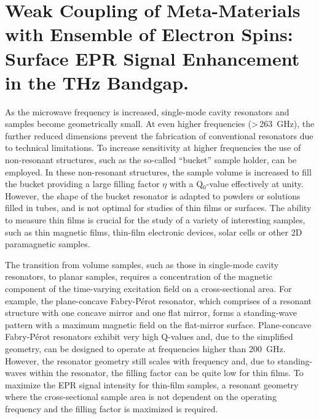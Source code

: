 \chapter[Weak Coupling of Meta-Materials for FD-FT THz EPR]{Weak Coupling of Meta-Materials with Ensemble of Electron Spins: Surface EPR Signal Enhancement in the THz Bandgap.}

As the microwave frequency is increased, single-mode cavity resonators and samples become geometrically small. At even higher frequencies (>\,263~GHz), the further reduced dimensions prevent the fabrication of conventional resonators due to technical limitations. To increase sensitivity at higher frequencies the use of non-resonant structures, such as the so-called ``bucket'' sample holder, can be employed. In these non-resonant structures, the sample volume is increased to fill the bucket providing a large filling factor $\eta$ with a Q$_0$-value effectively at unity. \cite{grinbergVHF} However, the shape of the bucket resonator is adapted to powders or solutions filled in tubes, and is not optimal for studies of thin films or surfaces. The ability to measure thin films is crucial for the study of a variety of interesting samples, such as thin magnetic films, thin-film electronic devices, solar cells or other 2D paramagnetic samples.

The transition from volume samples, such as those in single-mode cavity resonators, to planar samples, requires a concentration of the magnetic component of the time-varying excitation field on a cross-sectional area. For example, the plane-concave Fabry-P\'{e}rot resonator, which comprises of a resonant structure with one concave mirror and one flat mirror, forms a standing-wave pattern with a maximum magnetic field on the flat-mirror surface. \cite{grinbergVHF} Plane-concave Fabry-P\'{e}rot resonators exhibit very high Q-values and, due to the simplified geometry, can be designed to operate at frequencies higher than 200~GHz. \cite{Clarke1982Fabry, BraakmanFabry} However, the resonator geometry still scales with frequency and, due to standing-waves within the resonator, the filling factor can be quite low for thin films. To maximize the EPR signal intensity for thin-film samples, a resonant geometry where the cross-sectional sample area is not dependent on the operating frequency and the filling factor is maximized is required. 

